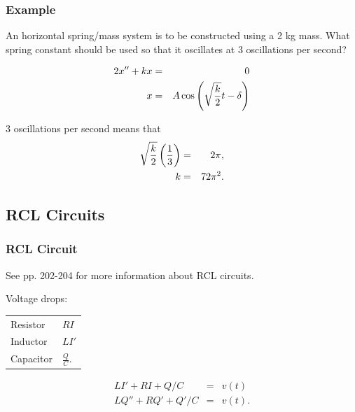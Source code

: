 \begin{frame}
  \frametitle{Example}

  An horizontal spring/mass system is to be constructed using a 2 kg
  mass. What spring constant should be used so that it oscillates at 3
  oscillations per second?

  \begin{eqnarray*}
    2 x'' + kx & = & 0 \\
    x & = & A \cos\left( \sqrt{\frac{k}{2}} t - \delta \right) \\
  \end{eqnarray*}

  {
    3 oscillations per second means that
    \begin{eqnarray*}
      \sqrt{\frac{k}{2}} \left( \frac{1}{3} \right) & = & 2 \pi, \\
      k & = & 72 \pi^2.
    \end{eqnarray*}
  }

\end{frame}

\subsection{RCL Circuits}

\begin{frame}
  \frametitle{RCL Circuit}

  See pp. 202-204 for more information about RCL circuits.

  Voltage drops: \\
  \begin{tabular}{l@{~$=$~}l}
    Resistor & $RI$ \\
    Inductor & $LI'$ \\
    Capacitor & $\frac{Q}{C}$.
  \end{tabular}

  \begin{eqnarray*}
    L I' + RI + Q/C & = & v(t) \\
    L Q'' + RQ' + Q'/C & = & v(t).
  \end{eqnarray*}

\end{frame}




